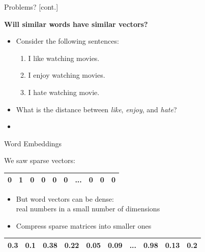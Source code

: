 \documentclass[professionalfonts, xcolor={usenames,svgnames,x11names,table}]{beamer}
\begin{document}
\begin{frame}{Problems? [cont.]}
\begin{center}
          \alert{\textbf{Will similar words have similar vectors?}}
 \end{center}
 
\begin{itemize}
\item  Consider the following sentences: 

 \begin{enumerate}
\item I like watching movies.
\item I enjoy watching movies.
\item I hate watching movie.
\end{enumerate}
\end{itemize}

\begin{itemize}
\item What is the distance between \emph{like}, \emph{enjoy}, and \emph{hate}?
\end{itemize}

\vspace{0.2cm}
\begin{itemize}
\item {}
\end{itemize}
\end{frame}

\begin{frame}{Word Embeddings}

We saw sparse vectors:

\begin{table}[]
\begin{tabular}{|l|l|l|l|l|l|l|l|l|l|}
\hline
0 & \alert{1} & 0 & 0 & 0 & 0 & ... & 0 & 0 & 0 \\ \hline
\end{tabular}
\end{table}

\pause
 \begin{itemize}   
          \item  But word vectors can be dense:\\
 real numbers in a small number of dimensions
\item Compress sparse matrices into smaller ones
 \end{itemize}
 
 \begin{table}[]
\begin{tabular}{|l|l|l|l|l|l|l|l|l|l|}
\hline
0.3 & 0.1 & \alert{0.38} & \alert{0.22} & 0.05 & 0.09 & ... & \alert{0.98} & 0.13 & 0.2\\ \hline
\end{tabular}
\end{table}
\end{frame}
\end{document}
